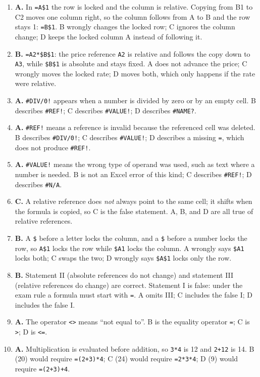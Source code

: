\begin{enumerate}[label=\textbf{Q\arabic*.}, leftmargin=*]
  relative. Copying from B1 to C2 moves down one row, so the row follows to 2
  and the column stays A: \texttt{=\$A2}. A ignores the row change; C moves
  the locked column; D moves the column without following the row.
\item \textbf{A.} In \texttt{=A\$1} the row is locked and the column is
  relative. Copying from B1 to C2 moves one column right, so the column
  follows from A to B and the row stays 1: \texttt{=B\$1}. B wrongly changes
  the locked row; C ignores the column change; D keeps the locked column A
  instead of following it.
\item \textbf{B.} \texttt{=A2*\$B\$1}: the price reference \texttt{A2} is
  relative and follows the copy down to \texttt{A3}, while \texttt{\$B\$1} is
  absolute and stays fixed. A does not advance the price; C wrongly moves the
  locked rate; D moves both, which only happens if the rate were relative.
\item \textbf{A.} \texttt{\#DIV/0!} appears when a number is divided by zero
  or by an empty cell. B describes \texttt{\#REF!}; C describes
  \texttt{\#VALUE!}; D describes \texttt{\#NAME?}.
\item \textbf{A.} \texttt{\#REF!} means a reference is invalid because the
  referenced cell was deleted. B describes \texttt{\#DIV/0!}; C describes
  \texttt{\#VALUE!}; D describes a missing \texttt{=}, which does not produce
  \texttt{\#REF!}.
\item \textbf{A.} \texttt{\#VALUE!} means the wrong type of operand was used,
  such as text where a number is needed. B is not an Excel error of this kind;
  C describes \texttt{\#REF!}; D describes \texttt{\#N/A}.
\item \textbf{C.} A relative reference does \emph{not} always point to the
  same cell; it shifts when the formula is copied, so C is the false
  statement. A, B, and D are all true of relative references.
\item \textbf{B.} A \texttt{\$} before a letter locks the column, and a
  \texttt{\$} before a number locks the row, so \texttt{A\$1} locks the row
  while \texttt{\$A1} locks the column. A wrongly says \texttt{\$A1} locks
  both; C swaps the two; D wrongly says \texttt{\$A\$1} locks only the row.
\item \textbf{B.} Statement II (absolute references do not change) and
  statement III (relative references do change) are correct. Statement I is
  false: under the exam rule a formula must start with \texttt{=}. A omits III;
  C includes the false I; D includes the false I.
\item \textbf{A.} The operator \texttt{<>} means ``not equal to''. B is the
  equality operator \texttt{=}; C is \texttt{>}; D is \texttt{<=}.
\item \textbf{A.} Multiplication is evaluated before addition, so
  \texttt{3*4} is 12 and \texttt{2+12} is 14. B (20) would require
  \texttt{=(2+3)*4}; C (24) would require \texttt{=2*3*4}; D (9) would require
  \texttt{=(2+3)+4}.


\end{enumerate}
